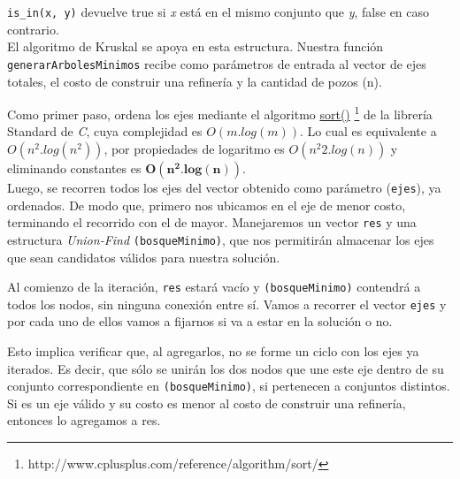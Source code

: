 \texttt{is_in(x, y)} devuelve true si \emph{x} est\'a en el mismo conjunto que \emph{y}, false en caso contrario. \\


El algoritmo de Kruskal se apoya en esta estructura. Nuestra funci\'on \texttt{generarArbolesMinimos} recibe como par\'ametros de entrada al vector de ejes totales, el costo de construir una refiner\'ia y la cantidad de pozos (n).


Como primer paso, ordena los ejes mediante el algoritmo  \href{http://www.cplusplus.com/reference/algorithm/sort/}{sort()} \footnote{http://www.cplusplus.com/reference/algorithm/sort/} de la librer\'ia Standard de \emph{C}, cuya complejidad es $O(m.log(m))$. Lo cual es equivalente a $O(n^2.log(n^2))$, por propiedades de logaritmo es $O(n^{2}2.log(n))$ y eliminando constantes es $\mathbf{O(n^2.log(n))}$. \\


Luego, se recorren todos los ejes del vector obtenido como par\'ametro (\texttt{ejes}), ya ordenados. De modo que, primero nos ubicamos en el eje de menor costo, terminando el recorrido con el de mayor. Manejaremos un vector \texttt{res} y una estructura \emph{Union-Find} \texttt{(bosqueMinimo)}, que nos permitir\'an almacenar los ejes que sean candidatos v\'alidos para nuestra soluci\'on.

Al comienzo de la iteraci\'on, \texttt{res} estar\'a vac\'io y \texttt{(bosqueMinimo)} contendr\'a a todos los nodos, sin ninguna conexi\'on entre s\'i. Vamos a recorrer el vector \texttt{ejes} y por cada uno de ellos vamos a fijarnos si va a estar en la soluci\'on o no.

Esto implica verificar que, al agregarlos, no se forme un ciclo con los ejes ya iterados. Es decir, que s\'olo se unir\'an los dos nodos que une este eje dentro de su conjunto correspondiente en \texttt{(bosqueMinimo)}, si pertenecen a conjuntos distintos. Si es un eje v\'alido y su costo es menor al costo de construir una refiner\'ia, entonces lo agregamos a res.\\


